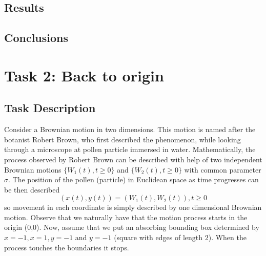 
\subsection{Results}
\label{sec:res1}


\subsection{Conclusions}
\label{sec:conc1}


\newpage
\section{Task 2: Back to origin}
\label{task2a}

\subsection{Task Description}
\label{sec:desc2}


Consider a Brownian motion in two dimensions. This motion is named after the botanist Robert Brown,
who first described the phenomenon, while looking through a microscope at pollen particle immersed
in water. Mathematically, the process observed by Robert Brown can be described with help of two
independent Brownian motions $\{ W_1 (t), t \geq 0 \}$ and $\{ W_2 (t), t \geq 0 \}$ with common parameter $\sigma$. The
position of the pollen (particle) in Euclidean space as time progresses can be then described
$$
(x(t), y(t)) = (W_1 (t), W_2 (t)) , t \geq 0
$$
so movement in each coordinate is simply described by one dimensional Brownian motion. Observe that
we naturally have that the motion process starts in the origin (0,0). Now, assume that we put an absorbing
bounding box determined by $x = −1, x = 1, y = −1$ and $y = −1$ (square with edges of length $2$). When
the process touches the boundaries it stops.


